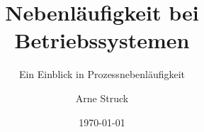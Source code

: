 \documentclass{beamer}
\title{Nebenläufigkeit bei Betriebssystemen}
\subtitle{Ein Einblick in Prozessnebenläufigkeit}
\author{Arne Struck}
\institute{Universität Hamburg}
\date{\today}
\begin{document}
\begin{frame}[plain]
	\maketitle
\end{frame}



\end{document}
